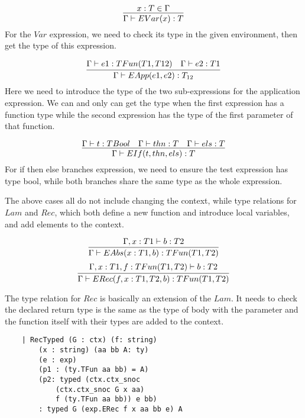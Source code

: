 \documentclass[conference]{IEEEtran}
\begin{document}
\begin{equation}
	\infer{\Gamma\vdash EVar(x):T}{x:T\in \Gamma}
	\label{eq:TIVar}
\end{equation}
For the $Var$ expression, we need to check its type in the given environment,
then get the type of this expression.

\begin{equation}
	\infer{\Gamma\vdash EApp(e1, e2):T_{12}}
	{\Gamma\vdash e1:TFun(T1, T12) & \Gamma\vdash e2:T1}
	\label{eq:TIApp}
\end{equation}
Here we need to introduce the type of the two sub-expressions for
the application expression. We can and only can get the type
when the first expression has a function type while the second expression
has the type of the first parameter of that function.

\begin{equation}
	\infer{\Gamma\vdash EIf(t, thn, els):T}
	{\Gamma\vdash t:TBool & \Gamma\vdash thn:T & \Gamma\vdash els:T}
	\label{eq:TIIf}
\end{equation}
For if then else branches expression, we need to ensure the test expression has type bool,
while both branches share the same type as the whole expression.

The above cases all do not include changing the context, while type
relations for $Lam$ and $Rec$, which both define a new function and
introduce local variables, and add elements to the context.

\begin{equation}
	\infer{\Gamma\vdash EAbs(x:T1, b):TFun(T1, T2)}
	{\Gamma,x:T1\vdash b:T2}
	\label{eq:TIAbs}
\end{equation}
\begin{equation}
	\infer{\Gamma\vdash ERec(f, x:T1, T2, b):TFun(T1, T2)}
	{\Gamma,x:T1,f:TFun(T1,T2)\vdash b:T2}
	\label{eq:TIRec}
\end{equation}

The type relation for $Rec$ is basically an extension of the $Lam$.
It needs to check the declared return type is the same as the type of
body with the parameter and the function itself with their types are added to the context.

\begin{lstlisting}
    | RecTyped (G : ctx) (f: string) 
        (x : string) (aa bb A: ty) 
        (e : exp) 
        (p1 : (ty.TFun aa bb) = A) 
        (p2: typed (ctx.ctx_snoc 
            (ctx.ctx_snoc G x aa) 
            f (ty.TFun aa bb)) e bb) 
        : typed G (exp.ERec f x aa bb e) A
\end{lstlisting}
\end{document}

